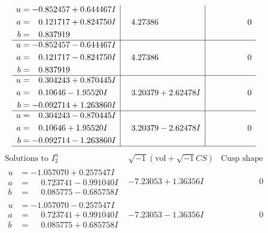 \documentclass[1p]{elsarticle_modified}
\theoremstyle{definition}
\newcommand{\I}{\sqrt{-1}}
\begin{document}
$$\begin{array}{c|c|c}
\begin{aligned}
u &= -0.852457 + 0.644467 I \\
a &= \phantom{-}0.121717 + 0.824750 I \\
b &= \phantom{-}0.837919\phantom{ +0.000000I}\end{aligned}
 & \phantom{-}4.27386\phantom{ +0.000000I} & \phantom{-0.000000 } 0 \\ \hline\begin{aligned}
u &= -0.852457 - 0.644467 I \\
a &= \phantom{-}0.121717 - 0.824750 I \\
b &= \phantom{-}0.837919\phantom{ +0.000000I}\end{aligned}
 & \phantom{-}4.27386\phantom{ +0.000000I} & \phantom{-0.000000 } 0 \\ \hline\begin{aligned}
u &= \phantom{-}0.304243 + 0.870445 I \\
a &= \phantom{-}0.10646 - 1.95520 I \\
b &= -0.092714 + 1.263860 I\end{aligned}
 & \phantom{-}3.20379 + 2.62478 I & \phantom{-0.000000 } 0 \\ \hline\begin{aligned}
u &= \phantom{-}0.304243 - 0.870445 I \\
a &= \phantom{-}0.10646 + 1.95520 I \\
b &= -0.092714 - 1.263860 I\end{aligned}
 & \phantom{-}3.20379 - 2.62478 I & \phantom{-0.000000 } 0\\
 \hline 
 \end{array}$$\newpage$$\begin{array}{c|c|c}  
\text{Solutions to }I^u_{2}& \I (\text{vol} + \sqrt{-1}CS) & \text{Cusp shape}\\
 \hline 
\begin{aligned}
u &= -1.057070 + 0.257547 I \\
a &= \phantom{-}0.723741 - 0.991040 I \\
b &= \phantom{-}0.085775 - 0.685758 I\end{aligned}
 & -7.23053 + 1.36356 I & \phantom{-0.000000 } 0 \\ \hline\begin{aligned}
u &= -1.057070 - 0.257547 I \\
a &= \phantom{-}0.723741 + 0.991040 I \\
b &= \phantom{-}0.085775 + 0.685758 I\end{aligned}
 & -7.23053 - 1.36356 I & \phantom{-0.000000 } 0 \\ \hline\begin{aligned}

\end{aligned}
\end{array}$$
\end{document}
